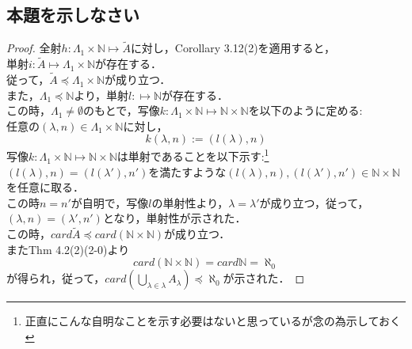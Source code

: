 \documentclass{jarticle}
\begin{document}
\subsection{本題を示しなさい}
\begin{proof}
	全射$h: \Lambda_1 \times \mathbb{N} \mapsto \tilde{A}$に対し，Corollary 3.12(2)を適用すると，\\
	単射$i : \tilde{A} \mapsto \Lambda_1 \times \mathbb{N}$が存在する．\\
	従って，$\tilde{A} \preceq \Lambda_1 \times \mathbb{N}$が成り立つ．\\
	また，$\Lambda_1 \preceq \mathbb{N} $より，単射$l : \mapsto  \mathbb{N}$が存在する．\\
	この時，$\Lambda_1 \neq \emptyset$のもとで，写像$k: \Lambda_1 \times \mathbb{N} \mapsto \mathbb{N} \times \mathbb{N}$を以下のように定める:\\
	任意の$(\lambda , n) \in \Lambda_1 \times \mathbb{N}$に対し，\\
	$$
	k(\lambda , n) := ( l(\lambda) ,n)
	$$
	写像$k: \Lambda_1 \times \mathbb{N} \mapsto \mathbb{N} \times \mathbb{N}$は単射であることを以下示す:\footnote{正直にこんな自明なことを示す必要はないと思っているが念の為示しておく}\\
	$(l(\lambda),n) = (l(\lambda '), n')$を満たすような$(l(\lambda),n) , (l(\lambda '), n') \in \mathbb{N} \times \mathbb{N}$
	を任意に取る．\\
	この時$n=n'$が自明で，写像$l$の単射性より，$\lambda = \lambda '$が成り立つ，従って，$(\lambda,n) =(\lambda',n')$となり，単射性が示された．\\
	この時，$ card\tilde{A} \preceq card(\mathbb{N} \times \mathbb{N})$が成り立つ．\\
	またThm 4.2(2)(2-0)より\\
	$$
	card(\mathbb{N} \times \mathbb{N}) = card\mathbb{N} = \aleph_0
	$$
	が得られ，従って，$card(\bigcup\limits_{\lambda \in \lambda}A_\lambda) \preceq \aleph_0$が示された．
\end{proof}
\end{document}
